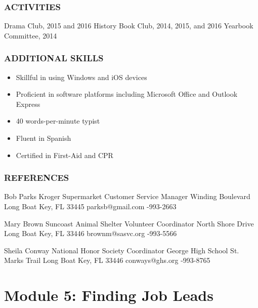 \subsubsection*{ACTIVITIES}
\break Drama Club, 2015 and 2016
\break History Book Club, 2014, 2015, and 2016
\break Yearbook Committee, 2014

\subsubsection*{ADDITIONAL SKILLS}
\begin{itemize}
	\item Skillful in using Windows and iOS devices
	\item Proficient in software platforms including Microsoft Office and Outlook Express
	\item 40 words-per-minute typist
	\item Fluent in Spanish
	\item Certified in First-Aid and CPR
\end{itemize}

\subsubsection*{REFERENCES}
\break Bob Parks
\break Kroger Supermarket
\break Customer Service Manager
 Winding Boulevard
\break Long Boat Key, FL 33445
\break parksb@gmail.com
-993-2663

Mary Brown
\break Suncoast Animal Shelter Volunteer Coordinator
 North Shore Drive
\break Long Boat Key, FL 33446
\break brownm@sasvc.org
-993-5566

Sheila Conway
\break National Honor Society Coordinator
\break George High School
 St. Marks Trail
\break Long Boat Key, FL 33446
\break conways@ghs.org
-993-8765


\pagebreak \section*{Module 5:  Finding Job Leads}
\noindent\makebox[\textwidth]{\rule{\linewidth}{0.4pt}}  \localtableofcontents
\noindent\makebox[\textwidth]{\rule{\linewidth}{0.4pt}}


